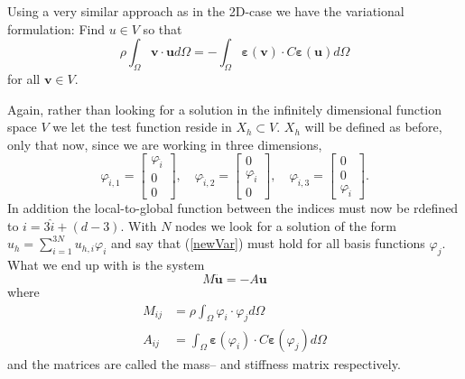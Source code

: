 \documentclass[paper=a4, fontsize=11pt]{scrartcl} %
\begin{document}
Using a very similar approach as in the 2D-case we have the variational formulation: Find $u\in V$ so that 
\begin{equation}
\rho \int_{\Omega}\boldsymbol{v}\cdot \boldsymbol{u}d\Omega=
-\int_{\Omega}\boldsymbol{\varepsilon}(\boldsymbol{v})\cdot C\boldsymbol{\varepsilon}(\boldsymbol{u})d\Omega
\label{newVar}
\end{equation}
for all $\boldsymbol{v}\in V$.

Again, rather than looking for a solution in the infinitely dimensional function space $V$ we let the test function reside in $X_h \subset V$. $X_h$ will be defined as before, only that now, since we are working in three dimensions,
\begin{equation*}
\varphi_{\hat{i},1} = \begin{bmatrix}
\varphi_{\hat{i}} \\ 0 \\ 0
\end{bmatrix}, \quad
\varphi_{\hat{i},2} = \begin{bmatrix}
 0 \\ \varphi_{\hat{i}}\\ 0
\end{bmatrix}, \quad
\varphi_{\hat{i},3} = \begin{bmatrix}
0 \\ 0 \\ \varphi_{\hat{i}}
\end{bmatrix}.
\end{equation*}
In addition the local-to-global function between the indices must now be rdefined to $i = 3\hat{i}+(d-3)$. With $N$ nodes we look for a solution of the form $u_h = \sum_{i=1}^{3N}u_{h,i}\varphi_i$ and say that (\ref{newVar}) must hold for all basis functions $\varphi_j$. What we end up with is the system
\begin{equation}
M\ddot{\boldsymbol{u}} = -A\boldsymbol{u}
\end{equation}
where
\begin{align*}
M_{ij} &= \rho \int_{\Omega}\varphi_i \cdot \varphi_j d\Omega \\
A_{ij} &= \int_\Omega \boldsymbol{\varepsilon}(\varphi_i)\cdot C\boldsymbol{\varepsilon}(\varphi_j)d\Omega
\end{align*}
and the matrices are called the mass-- and stiffness matrix respectively.
\end{document}
